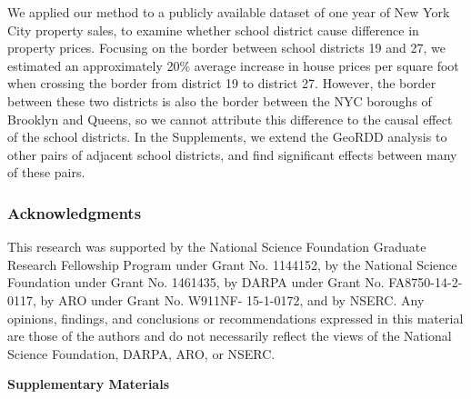 \documentclass{article}
\begin{document}
We applied our method to a publicly available dataset of one year of New York City property sales, to examine whether school district cause difference in property prices.
Focusing on the border between school districts 19 and 27, we estimated an approximately 20\% average increase in house prices per square foot when crossing the border from district 19 to district 27.
However, the border between these two districts is also the border between the NYC boroughs of Brooklyn and Queens, so we cannot attribute this difference to the causal effect of the school districts.
In the Supplements, we extend the GeoRDD analysis to other pairs of adjacent school districts, and find significant effects between many of these pairs.

\newpage
\subsubsection*{Acknowledgments}
This research was supported by the National Science Foundation Graduate Research Fellowship Program under Grant No. 1144152, by the National Science Foundation under Grant No. 1461435, by DARPA under Grant No. FA8750-14-2-0117, by ARO under Grant No. W911NF- 15-1-0172, and by NSERC. Any opinions, findings, and conclusions or recommendations expressed in this material are those of the authors and do not necessarily reflect the views of the National Science Foundation, DARPA, ARO, or NSERC.




\pagebreak
\begin{center}
	\bf 
	\LARGE
	Supplementary Materials
\end{center}
\setcounter{equation}{0}
\setcounter{figure}{0}
\setcounter{table}{0}
\setcounter{section}{0}
\newcommand{\sprefix}{S-}
\renewcommand{\theequation}{\sprefix\arabic{equation}}
\renewcommand{\thesection}{\sprefix\arabic{section}}
\renewcommand{\thefigure}{\sprefix\arabic{figure}}
\renewcommand{\thetable}{\sprefix\arabic{table}}


\end{document}
